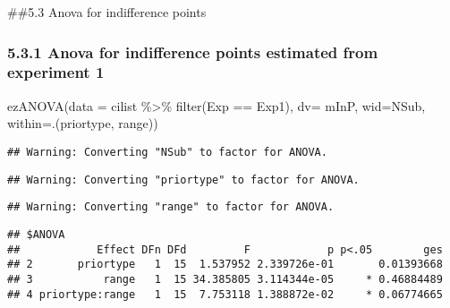 \documentclass[
]{article}
\newenvironment{Shaded}{\begin{snugshade}}{\end{snugshade}}
\newcommand{\AttributeTok}[1]{\textcolor[rgb]{0.77,0.63,0.00}{#1}}
\newcommand{\FunctionTok}[1]{\textcolor[rgb]{0.00,0.00,0.00}{#1}}
\newcommand{\NormalTok}[1]{#1}
\newcommand{\SpecialCharTok}[1]{\textcolor[rgb]{0.00,0.00,0.00}{#1}}
\newcommand{\StringTok}[1]{\textcolor[rgb]{0.31,0.60,0.02}{#1}}
\begin{document}
\#\#5.3 Anova for indifference points

\hypertarget{anova-for-indifference-points-estimated-from-experiment-1}{%
\subsubsection{5.3.1 Anova for indifference points estimated from
experiment
1}\label{anova-for-indifference-points-estimated-from-experiment-1}}

\begin{Shaded}
\begin{Highlighting}[]
\FunctionTok{ezANOVA}\NormalTok{(}\AttributeTok{data =}\NormalTok{ cilist }\SpecialCharTok{\%\textgreater{}\%} \FunctionTok{filter}\NormalTok{(Exp }\SpecialCharTok{==} \StringTok{\textquotesingle{}Exp1\textquotesingle{}}\NormalTok{), }\AttributeTok{dv=}\NormalTok{ mInP, }\AttributeTok{wid=}\NormalTok{NSub, }\AttributeTok{within=}\NormalTok{.(priortype, range))}
\end{Highlighting}
\end{Shaded}

\begin{verbatim}
## Warning: Converting "NSub" to factor for ANOVA.
\end{verbatim}

\begin{verbatim}
## Warning: Converting "priortype" to factor for ANOVA.
\end{verbatim}

\begin{verbatim}
## Warning: Converting "range" to factor for ANOVA.
\end{verbatim}

\begin{verbatim}
## $ANOVA
##            Effect DFn DFd         F            p p<.05        ges
## 2       priortype   1  15  1.537952 2.339726e-01       0.01393668
## 3           range   1  15 34.385805 3.114344e-05     * 0.46884489
## 4 priortype:range   1  15  7.753118 1.388872e-02     * 0.06774665
\end{verbatim}
\end{document}
